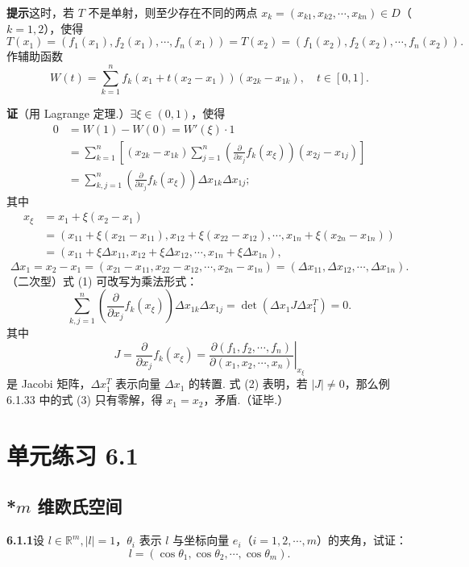 \documentclass[UTF8,12pt,a4paper,fontset=fandol]{ctexart}
\begin{document}
\noindent\textbf{提示}\quad 这时，若 $T$ 不是单射，则至少存在不同的两点 $x_k=(x_{k1},x_{k2},\cdots,x_{kn})\in D$（$k=1,2$），使得
\[
  T(x_1)=(f_1(x_1),f_2(x_1),\cdots,f_n(x_1))
  =T(x_2)=(f_1(x_2),f_2(x_2),\cdots,f_n(x_2)).
\]
作辅助函数
\[
  W(t)=\sum_{k=1}^n f_k(x_1+t(x_2-x_1))(x_{2k}-x_{1k}),\quad t\in[0,1].
\]

\noindent\textbf{证}\quad （用 Lagrange 定理.）$\exists\xi\in(0,1)$，使得
\[
\begin{aligned}
0&=W(1)-W(0)=W'(\xi)\cdot1\\
&=\sum_{k=1}^n\left[(x_{2k}-x_{1k})\sum_{j=1}^n
\left(\frac{\partial}{\partial x_j}f_k(x_\xi)\right)(x_{2j}-x_{1j})\right]\\
&=\sum_{k,j=1}^n\left(\frac{\partial}{\partial x_j}f_k(x_\xi)\right)\Delta x_{1k}\Delta x_{1j};
\end{aligned}
\tag{1}
\]
其中
\[
\begin{aligned}
x_\xi&=x_1+\xi(x_2-x_1)\\
&=(x_{11}+\xi(x_{21}-x_{11}),x_{12}+\xi(x_{22}-x_{12}),\cdots,x_{1n}+\xi(x_{2n}-x_{1n}))\\
&=(x_{11}+\xi\Delta x_{11},x_{12}+\xi\Delta x_{12},\cdots,x_{1n}+\xi\Delta x_{1n}),
\end{aligned}
\]
\[
  \Delta x_1=x_2-x_1=(x_{21}-x_{11},x_{22}-x_{12},\cdots,x_{2n}-x_{1n})
  =(\Delta x_{11},\Delta x_{12},\cdots,\Delta x_{1n}).
\]
（二次型）式 (1) 可改写为乘法形式：
\[
  \sum_{k,j=1}^n
  \left(\frac{\partial}{\partial x_j}f_k(x_\xi)\right)\Delta x_{1k}\Delta x_{1j}
  =\det(\Delta x_1J\Delta x_1^T)=0. \tag{2}
\]
其中
\[
  J=\frac{\partial}{\partial x_j}f_k(x_\xi)
  =
  \left.\frac{\partial(f_1,f_2,\cdots,f_n)}{\partial(x_1,x_2,\cdots,x_n)}\right|_{x_\xi}
\]
是 Jacobi 矩阵，$\Delta x_1^T$ 表示向量 $\Delta x_1$ 的转置. 式 (2) 表明，若 $|J|\ne0$，那么例 6.1.33 中的式 (3) 只有零解，得 $x_1=x_2$，矛盾.（证毕.）

\section*{单元练习 6.1}

\subsection*{*$m$ 维欧氏空间}

\noindent\textbf{6.1.1}\quad 设 $l\in\mathbb{R}^m,|l|=1$，$\theta_i$ 表示 $l$ 与坐标向量 $e_i$（$i=1,2,\cdots,m$）的夹角，试证：
\[
  l=(\cos\theta_1,\cos\theta_2,\cdots,\cos\theta_m).
\]
\end{document}
